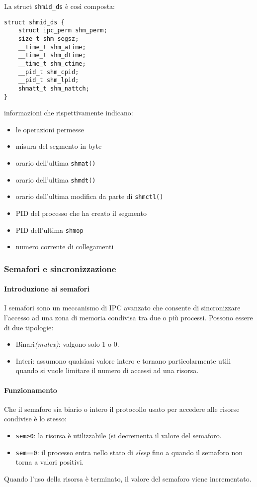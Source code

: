 \documentclass[a4paper, 10pt]{article}
\begin{document}
La struct \verb|shmid_ds| è così composta:
\begin{verbatim}
struct shmid_ds {
    struct ipc_perm shm_perm;
    size_t shm_segsz;
    __time_t shm_atime;
    __time_t shm_dtime;
    __time_t shm_ctime;
    __pid_t shm_cpid;
    __pid_t shm_lpid;
    shmatt_t shm_nattch;
}
\end{verbatim}
informazioni che rispettivamente indicano:
\begin{itemize}
\item le operazioni permesse
\item misura del segmento in byte
\item orario dell'ultima \verb|shmat()|
\item orario dell'ultima \verb|shmdt()|
\item orario dell'ultima modifica da parte di \verb|shmctl()|
\item PID del processo che ha creato il segmento
\item PID dell'ultima \verb|shmop|
\item numero corrente di collegamenti
\end{itemize}

\subsubsection{Semafori e sincronizzazione}
\paragraph{Introduzione ai semafori}
I semafori sono un meccanismo di IPC avanzato che consente di sincronizzare l'accesso ad una zona di memoria condivisa tra due o più processi.
Possono essere di due tipologie:
\begin{itemize}
\item Binari\textit{(mutex)}: valgono solo 1 o 0.
\item Interi: assumono qualsiasi valore intero e tornano particolarmente utili quando si vuole limitare il numero di accessi ad una risorsa.
\end{itemize}

\paragraph{Funzionamento}
Che il semaforo sia biario o intero il protocollo usato per accedere alle risorse condivise è lo stesso:
\begin{itemize}
\item \verb|sem>0|: la risorsa è utilizzabile (si decrementa il valore del semaforo.
\item \verb|sem==0|: il processo entra nello stato di \textit{sleep} fino a quando il semaforo non torna a valori positivi.
\end{itemize}
Quando l'uso della risorsa è terminato, il valore del semaforo viene incrementato.
\end{document}
